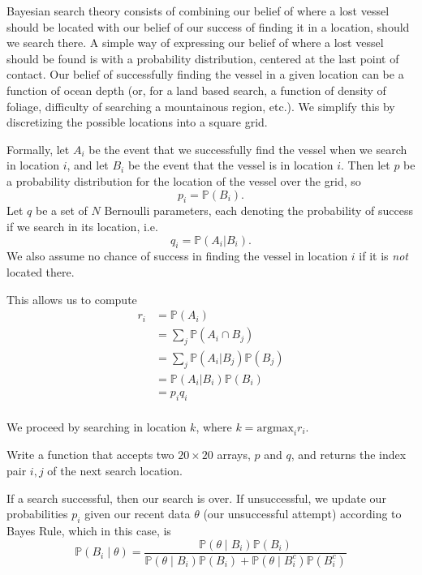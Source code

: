 Bayesian search theory consists of combining our belief of where a lost vessel should be located with our belief of our success of finding it in a location, should we search there. A simple way of expressing our belief of where a lost vessel should be found is with a probability distribution, centered at the last point of contact. Our belief of successfully finding the vessel in a given location can be a function of ocean depth (or, for a land based search, a function of density of foliage, difficulty of searching a mountainous region, etc.). We simplify this by discretizing the possible locations into a square grid.

Formally, let $A_{i}$ be the event that we successfully find the vessel when we search in location $i$, and let $B_{i}$ be the event that the vessel is in location $i$. Then let $p$ be a probability distribution for the location of the vessel over the grid, so $$p_{i} = \mathbb{P}(B_{i}).$$ Let $q$ be a set of $N$ Bernoulli parameters, each denoting the probability of success if we search in its location, i.e.
$$q_{i} = \mathbb{P}(A_{i} | B_{i}).$$ We also assume no chance of success in finding the vessel in location $i$ if it is \emph{not} located there.

This allows us to compute 
\begin{align*}
r_{i} & = \mathbb{P}(A_{i}) \\
& = \sum_{j} \mathbb{P}(A_{i} \cap B_{j}) \\
& = \sum_{j} \mathbb{P}(A_{i} | B_{j})\mathbb{P}(B_{j}) \\
& = \mathbb{P}(A_{i} | B_{i})\mathbb{P}(B_{i}) \\
& = p_{i}q_{i} \\
\end{align*}

We proceed by searching in location $k$, where $k = \text{argmax}_{i} r_{i}$.

\begin{problem}
Write a function that accepts two $20 \times 20$ arrays, $p$ and $q$, and returns the index pair $i,j$ of the next search location.
\end{problem}

If a search successful, then our search is over. If unsuccessful, we update our probabilities $p_{i}$ given our recent data $\theta$ (our unsuccessful attempt) according to Bayes Rule, which in this case, is
\begin{equation*}
\mathbb{P}(B_{i} \; | \; \theta) = \frac{\mathbb{P}(\theta \; | \; B_{i})\mathbb{P}(B_{i})}{\mathbb{P}(\theta \; | \; B_{i})\mathbb{P}(B_{i}) + \mathbb{P}(\theta \; | \; B_{i}^{c})\mathbb{P}(B_{i}^{c})}
\end{equation*}

